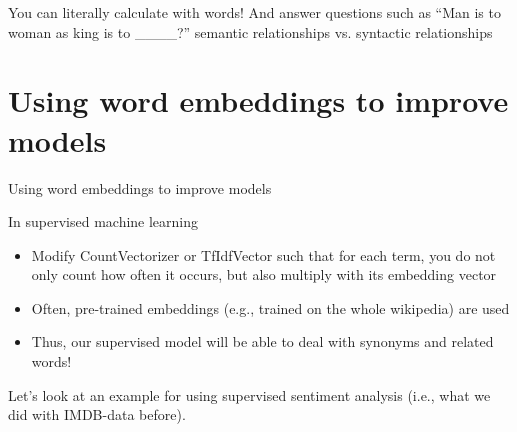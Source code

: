 \documentclass{beamer}
\begin{document}
\begin{frame}{You can literally calculate with words!}
And answer questions such as ``Man is to woman as king is to \_\_\_\_?''
semantic relationships vs. syntactic relationships
\end{frame}




\section[Improving models]{Using word embeddings to improve models}
\begin{frame}[plain]
Using word embeddings to improve models
\end{frame}

\begin{frame}{In supervised machine learning}
\begin{itemize}[<+->]
	\item Modify CountVectorizer or TfIdfVector such that for each term, you do not only count how often it occurs, but also multiply with its embedding vector
	\item Often, pre-trained embeddings (e.g., trained on the whole wikipedia) are used
	\item Thus, our supervised model will be able to deal with synonyms and related words!
\end{itemize}

\pause 
Let's look at an example for using supervised sentiment analysis (i.e., what we did with IMDB-data before).


\end{frame}
\end{document}
